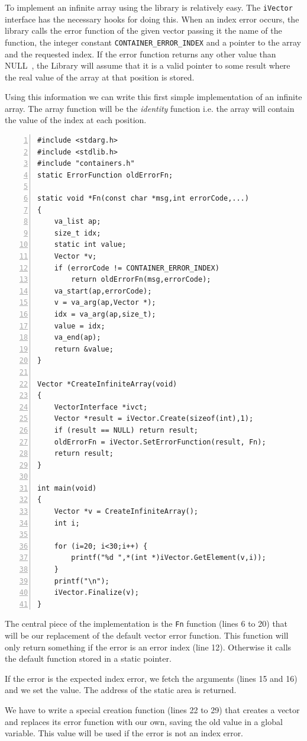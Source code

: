 \documentclass[12pt,a4paper,openany]{memoir} %
\newif\iftth
\newcommand{\Null}{{\iftth \ NULL \else \footnotesize NULL\  \fi}}
\begin{document}
{{To implement an infinite array using the library is relatively easy. The \verb,iVector, interface has the necessary hooks for doing this.
When an index error occurs, the library calls the error function of the given vector passing it the name of the function, the integer constant 
\verb,CONTAINER_ERROR_INDEX, and a pointer to the array and the requested index. If the error function returns any other value than \Null,
the Library will assume that it is a valid pointer to some result where the real value of the array at that position is stored.

Using this information we can write this first simple implementation of an infinite array. The array function will be the \textsl{identity} function
i.e. the array will contain the value of the index at each position.
\begin{Verbatim}[numbers=left]
#include <stdarg.h>
#include <stdlib.h>
#include "containers.h"
static ErrorFunction oldErrorFn;

static void *Fn(const char *msg,int errorCode,...)
{
    va_list ap;
    size_t idx;
    static int value;
    Vector *v;
    if (errorCode != CONTAINER_ERROR_INDEX)
        return oldErrorFn(msg,errorCode);
    va_start(ap,errorCode);
    v = va_arg(ap,Vector *);
    idx = va_arg(ap,size_t);
    value = idx;
    va_end(ap);
    return &value;
}

Vector *CreateInfiniteArray(void)
{
    VectorInterface *ivct;
    Vector *result = iVector.Create(sizeof(int),1);
    if (result == NULL) return result;
    oldErrorFn = iVector.SetErrorFunction(result, Fn);
    return result;
}

int main(void)
{
    Vector *v = CreateInfiniteArray();
    int i;

    for (i=20; i<30;i++) {
        printf("%d ",*(int *)iVector.GetElement(v,i));
    }
    printf("\n");
    iVector.Finalize(v);
}

\end{Verbatim}
The central piece of the implementation is the \verb,Fn, function (lines 6 to 20) 
that will be our replacement of the default vector error function. This function
will only return something if the error is an error index (line 12). Otherwise it calls the default function stored in a static pointer.

If the error is the expected index error, we fetch the arguments (lines 15 and 16) and we set the value. 
The address of the static area is returned.

We have to write a special creation function (lines 22 to 29) that creates a vector and replaces its error function 
with our own, saving the old
value in a global variable. This value will be used if the error is not an index error.

}}
\end{document}
